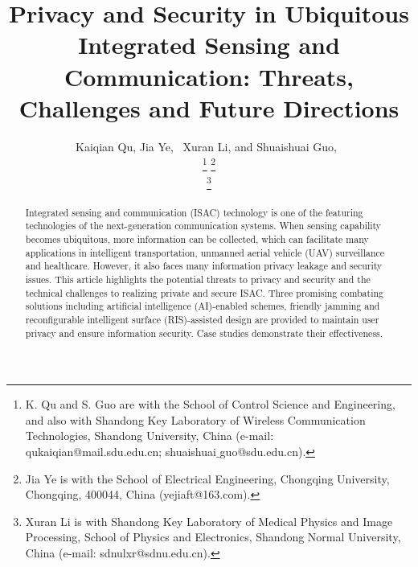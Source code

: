 \documentclass[10pt,journal,twocolumn,twoside]{IEEEtran} %
\begin{document}
\makeatletter
\def\changeBibColor#1{%
  \in@{#1}{}%
  \ifin@\color{red}\else\normalcolor\fi
}
 
\xpatchcmd\@bibitem
  {\item}
  {\changeBibColor{#1}\item}
  {}{\fail}
 
\xpatchcmd\@lbibitem
  {\item}
  {\changeBibColor{#2}\item}
  {}{\fail}
\makeatother

\title
{Privacy and Security in Ubiquitous Integrated Sensing and Communication: Threats, Challenges and Future Directions}
\author{Kaiqian Qu,  Jia Ye,~ Xuran Li, 
and Shuaishuai Guo,~

\thanks{K. Qu and S. Guo  are with the School of Control Science and Engineering, and also with Shandong Key Laboratory of Wireless Communication Technologies, Shandong University, China (e-mail: qukaiqian@mail.sdu.edu.cn; shuaishuai$\_$guo@sdu.edu.cn). }
\thanks{Jia Ye is with the School of Electrical Engineering, Chongqing University, Chongqing, 400044, China (yejiaft@163.com).}

\thanks{Xuran Li is with Shandong Key Laboratory of Medical Physics and Image Processing, School of Physics and Electronics, Shandong Normal University, China (e-mail: sdnulxr@sdnu.edu.cn).}
   }
\maketitle


\begin{abstract} 
Integrated sensing and communication (ISAC) technology is one of the featuring technologies of the next-generation communication systems. When sensing capability becomes ubiquitous, more information can be collected, which can facilitate many applications in intelligent transportation, unmanned aerial vehicle (UAV) surveillance and healthcare. However, it also faces many information privacy leakage and security issues. This article highlights the potential threats to privacy and security and the technical challenges to realizing private and secure ISAC. Three promising combating solutions including artificial intelligence (AI)-enabled schemes, friendly jamming and reconfigurable intelligent surface (RIS)-assisted design are provided to maintain user privacy and ensure information security. Case studies demonstrate their effectiveness.

\end{abstract}
\end{document}
